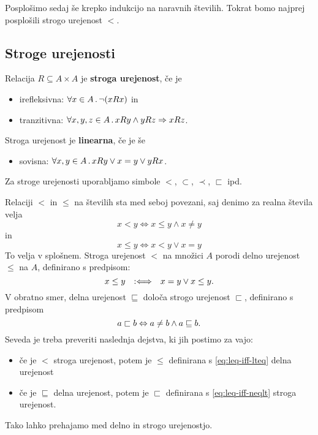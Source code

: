Posplošimo sedaj še krepko indukcijo na naravnih številih. Tokrat bomo najprej posplošili
strogo urejenost $<$.

\subsection{Stroge urejenosti}

\begin{definicija}
  Relacija $R \subseteq A \times A$ je \textbf{stroga urejenost}, če je
  \begin{itemize}
  \item irefleksivna: $\forall x \in A \,.\, \lnot (x R x)$ in
  \item tranzitivna: $\forall x, y, z \in A \,.\, x R y \land y R z \Rightarrow x R z$.
  \end{itemize}
  Stroga urejenost je \textbf{linearna}, če je še
  \begin{itemize}
  \item sovisna: $\forall x, y \in A \,.\, x R y \lor x = y \lor y R x$.
  \end{itemize}
  Za stroge urejenosti uporabljamo simbole $<$, $\subset$, $\prec$, $\sqsubset$ ipd.
\end{definicija}

Relaciji $<$ in $\leq$ na številih sta med seboj povezani, saj denimo za realna števila velja
%
\begin{equation*}
  x < y \iff x \leq y \land x \neq y
\end{equation*}
%
in
%
\begin{equation}
  \label{eq:leq-iff-lteq}
  x \leq y \iff x < y \lor x = y
\end{equation}
%
To velja v splošnem. Stroga urejenost $<$ na množici $A$ porodi delno urejenost $\leq$ na $A$,
definirano s predpisom:
%
\begin{equation*}
    x \leq y  \quad {{:}{\Longleftrightarrow}}\quad x = y \lor x \leq y.
\end{equation*}
%
V obratno smer, delna urejenost $\sqsubseteq$ določa strogo urejenost $\sqsubset$, definirano s predpisom
%
\begin{equation}
  \label{eq:leq-iff-neqlt}
  a \sqsubset b  \Leftrightarrow  a \neq b \land a \sqsubseteq b.
\end{equation}
%
Seveda je treba preveriti naslednja dejstva, ki jih postimo za vajo:
%
\begin{itemize}
\item če je $<$ stroga urejenost, potem je $\leq$ definirana s \eqref{eq:leq-iff-lteq} delna urejenost
\item če je $\sqsubseteq$ delna urejenost, potem je $\sqsubset$ definirana s \eqref{eq:leq-iff-neqlt} stroga urejenost.
\end{itemize}
%
Tako lahko prehajamo med delno in strogo urejenostjo.

